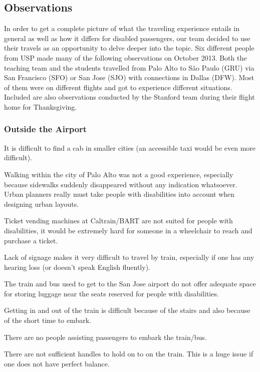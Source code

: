 \subsection{Observations}
In order to get a complete picture of what the traveling experience entails in general as well as how it differs for disabled passengers, our team decided to use their travels as an opportunity to delve deeper into the topic. Six different people from USP made many of the following observations on October 2013. Both the teaching team and the students travelled from Palo Alto to São Paulo (GRU) via San Francisco (SFO) or San Jose (SJO) with connections in Dallas (DFW). Most of them were on different flights and got to experience different situations. Included are also observations conducted by the Stanford team during their flight home for Thanksgiving.

\subsubsection{Outside the Airport}
\begin{list}{-}{}
  \item It is difficult to find a cab in smaller cities (an accessible taxi would be even more difficult).
  \item Walking within the city of Palo Alto was not a good experience, especially because sidewalks suddenly disappeared without any indication whatsoever. Urban planners really must take people with disabilities into account when designing urban layouts.
  \item Ticket vending machines at Caltrain/BART are not suited for people with disabilities, it would be extremely hard for someone in a wheelchair to reach and purchase a ticket.
  \item Lack of signage makes it very difficult to travel by train, especially if one has any hearing loss (or doesn’t speak English fluently).
  \item The train and bus used to get to the San Jose airport do not offer adequate space for storing luggage near the seats reserved for people with disabilities.
  \item Getting in and out of the train is difficult because of the stairs and also because of the short time to embark.
  \item There are no people assisting passengers to embark the train/bus.
  \item There are not sufficient handles to hold on to on the train. This is a huge issue if one does not have perfect balance. 
\end{list}

